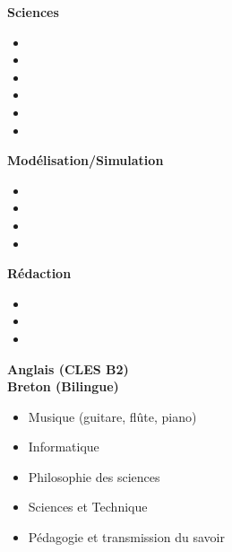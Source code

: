 


\large\textbf{Sciences}

\begin{itemize}
\item {}
\item {}
\item {}
\item {}
\item {}
\item {}
\end{itemize}

\divider

\large\textbf{Modélisation/Simulation}
\begin{itemize}
	\item {}
	\item {}
	\item {}
	\item {}
\end{itemize}

\divider

\large\textbf{Rédaction}
\begin{itemize}
	\item{}	
	\item {}
	\item {}
\end{itemize}







\medskip


 \textbf{Anglais (CLES B2)}\\
 \textbf{Breton (Bilingue)}


\medskip



\begin{itemize}
	\item Musique (guitare, flûte, piano)
	\item Informatique
	\item Philosophie des sciences
	\item Sciences et Technique
	\item Pédagogie et transmission du savoir
\end{itemize}

